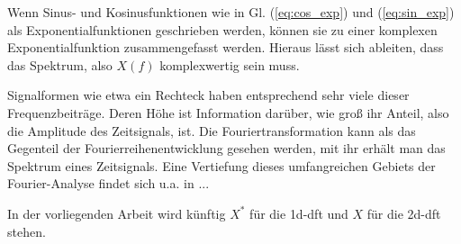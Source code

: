 Wenn Sinus- und Kosinusfunktionen wie in Gl. (\ref{eq:cos_exp}) und (\ref{eq:sin_exp}) als Exponentialfunktionen geschrieben werden,
können sie zu einer komplexen Exponentialfunktion zusammengefasst werden.
Hieraus lässt sich ableiten, dass das Spektrum, also $X(f)$ komplexwertig sein muss.

Signalformen wie etwa ein Rechteck haben entsprechend sehr viele dieser Frequenzbeiträge. Deren Höhe ist Information darüber, wie groß ihr Anteil, also die Amplitude des 
Zeitsignals, ist. Die Fouriertransformation kann als das Gegenteil der Fourierreihenentwicklung gesehen werden, mit ihr erhält man das Spektrum eines Zeitsignals. Eine
Vertiefung dieses umfangreichen Gebiets der Fourier-Analyse findet sich u.a. in ...



In der vorliegenden Arbeit wird künftig $X^*$ für die \gls{1d-dft} und $X$ für die \gls{2d-dft} stehen.

